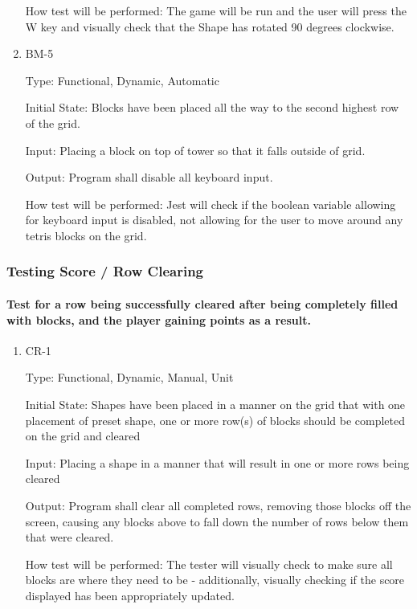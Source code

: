 \documentclass[12pt, titlepage]{article}
\begin{document}
\begin{enumerate}
How test will be performed: The game will be run and the user will press the W key and visually check that the Shape has rotated 90 degrees clockwise. 

\item{BM-5\\}

Type: Functional, Dynamic, Automatic
					
Initial State: Blocks have been placed all the way to the second highest row of the grid.
					
Input: Placing a block on top of tower so that it falls outside of grid.
					
Output: Program shall disable all keyboard input.
					
How test will be performed: Jest will check if the boolean variable allowing for keyboard input is disabled, not allowing for the user to move around any tetris blocks on the grid.

\end{enumerate}

\subsubsection{Testing Score / Row Clearing}
\paragraph{Test for a row being successfully cleared after being completely filled with blocks, and the player gaining points as a result.}

\begin{enumerate}

\item{CR-1\\}

Type: Functional, Dynamic, Manual, Unit
					
Initial State: Shapes have been placed in a manner on the grid that with one placement of preset shape, one or more row(s) of blocks should be completed on the grid and cleared
					
Input: Placing a shape in a manner that will result in one or more rows being cleared
					
Output: Program shall clear all completed rows, removing those blocks off the screen, causing any blocks above to fall down the number of rows below them that were cleared.
					
How test will be performed: The tester will visually check to make sure all blocks are where they need to be - additionally, visually checking if the score displayed has been appropriately updated.

\end{enumerate}
\end{document}

